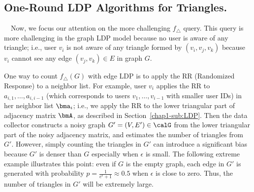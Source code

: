 \subsection{One-Round LDP Algorithms for Triangles.}
\label{chap1-sub:non-interactive_triangles}
~~Now, we focus our attention on the more challenging $f_\triangle$ query. This
query is more challenging in the graph LDP model because no user is aware of any
triangle; i.e., user $v_i$ is not aware of any triangle formed by $(v_i, v_j, v_k)$ because $v_i$ cannot see any edge $(v_j, v_k) \in E$ in graph $G$. 

One way to count $f_\triangle(G)$ with edge LDP is 
to apply the RR (Randomized Response) 
to a neighbor list. 
For example, user $v_i$ applies the RR to 
$a_{i,1}, \ldots, a_{i,i-1}$ (which corresponds to users $v_1, \ldots, v_{i-1}$ with smaller user IDs) in her neighbor list $\bma_i$; i.e., 
we apply the RR to the lower triangular part of adjacency matrix $\bmA$, as described in Section~\ref{chap1-sub:LDP}. 
Then the data collector constructs a noisy graph $G'=(V,E') \in \calG$ from the lower triangular part of the noisy adjacency matrix, and 
estimates the number of triangles 
from $G'$. 
However, 
simply counting
the triangles in 
$G'$ 
can introduce a significant bias 
because $G'$ is denser than $G$ especially when $\epsilon$ is small. 
The following extreme example illustrates this point: 
even if $G$ is the empty graph, 
each edge in $G'$ is generated with probability $p = \frac{1}{e^\epsilon+1} \approx 0.5$ when $\epsilon$ is close to zero. 
Thus, the 
number of triangles in 
$G'$ 
will be extremely large. 

